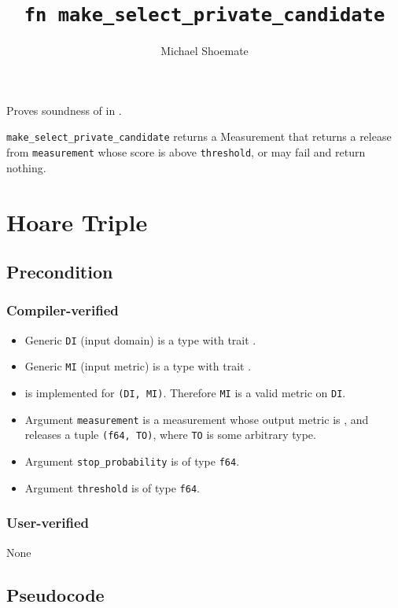 \documentclass{article}
\title{\texttt{fn make\_select\_private\_candidate}}
\author{Michael Shoemate}
\date{}
\begin{document}
\maketitle

\contrib
Proves soundness of  in .

\texttt{make\_select\_private\_candidate} returns a Measurement that returns a release from \texttt{measurement} whose score is above \texttt{threshold},
or may fail and return nothing.

\section{Hoare Triple}
\subsection*{Precondition}
\subsubsection*{Compiler-verified}
\begin{itemize}
    \item Generic \texttt{DI} (input domain) is a type with trait . 
    \item Generic \texttt{MI} (input metric) is a type with trait . 
    \item {} is implemented for \texttt{(DI, MI)}. Therefore \texttt{MI} is a valid metric on \texttt{DI}.
    \item Argument \texttt{measurement} is a measurement whose output metric is , and releases a tuple \texttt{(f64, TO)}, where \texttt{TO} is some arbitrary type.
    \item Argument \texttt{stop\_probability} is of type \texttt{f64}.
    \item Argument \texttt{threshold} is of type \texttt{f64}.
\end{itemize}

\subsubsection*{User-verified}
None

\subsection*{Pseudocode}

\end{document}

